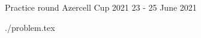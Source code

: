 \documentclass [11pt, a4paper, oneside] {article}
\begin{document}
\contest
{Practice round}%
{Azercell Cup 2021}%
{23 - 25 June 2021}%


\renewcommand{\t}{\texttt}


\graphicspath{{../../problems/a+b/statements/english/}}
  \def\ProblemIndex{A}
{./problem.tex}

  
\end{document}
